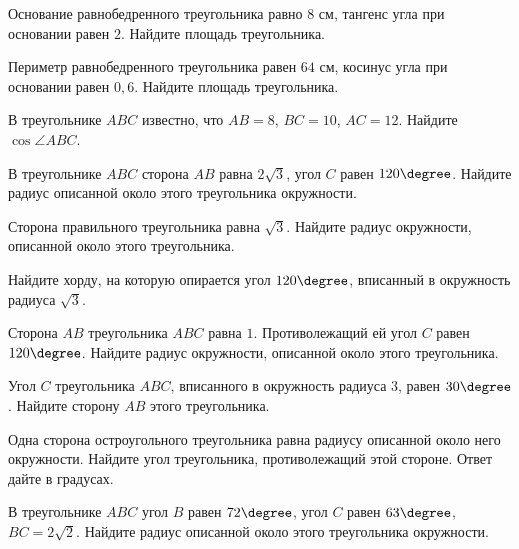 \begin{class}[number=1]
\begin{listofex}
		\item Основание равнобедренного треугольника равно \( 8 \) см, тангенс угла при основании равен \( 2 \). Найдите площадь треугольника. 
		\item Периметр равнобедренного треугольника равен \( 64 \) см, косинус угла при основании равен \( 0,6 \). Найдите площадь треугольника.
		\item В треугольнике \( ABC \) известно, что \( AB=8 \), \( BC=10 \), \( AC=12 \). Найдите \( \cos\angle ABC \).
		\item В треугольнике \( ABC \) сторона \( AB \) равна \( 2\sqrt{3} \), угол \( C \) равен \( 120\degree \). Найдите радиус описанной около этого треугольника окружности.
		\item Сторона правильного треугольника равна \( \sqrt{3} \). Найдите радиус окружности, описанной около этого треугольника.
		\item Найдите хорду, на которую опирается угол \( 120\degree \), вписанный в окружность радиуса \( \sqrt{3} \).  
		\item Сторона \( AB \) треугольника \( ABC \) равна \( 1 \). Противолежащий ей угол \( C \) равен \( 120\degree \). Найдите радиус окружности, описанной около этого треугольника.
		\item Угол \( C \) треугольника \( ABC \), вписанного в окружность радиуса \( 3 \), равен \( 30\degree \). Найдите сторону \( AB \) этого треугольника.
		\item Одна сторона остроугольного треугольника равна радиусу описанной около него окружности. Найдите угол треугольника, противолежащий этой стороне. Ответ дайте в градусах.
		\item В треугольнике \( ABC \) угол \( B \) равен \( 72\degree \), угол \( C \) равен \( 63\degree \), \( BC=2\sqrt{2} \). Найдите радиус описанной около этого треугольника окружности.
	\end{listofex}
\end{class}

